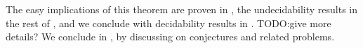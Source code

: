 The easy implications of this theorem are proven in ,
the undecidability results in the rest of ,
and we conclude with decidability results in .
TODO:give more details?
We conclude in , by discussing on
conjectures and related problems.

